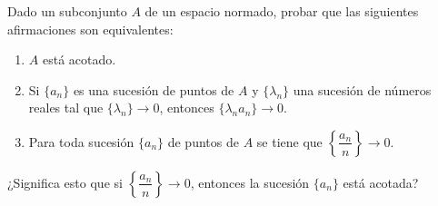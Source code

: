 \begin{ejercicio}
Dado un subconjunto \( A \) de un espacio normado, probar que las siguientes afirmaciones son equivalentes:
    \begin{enumerate}
        \item \( A \) está acotado.
        \item Si \( \{a_n\} \) es una sucesión de puntos de \( A \) y \( \{\lambda_n\} \) una sucesión de números reales tal que \( \{\lambda_n\} \rightarrow 0 \), entonces \( \{\lambda_n  a_n\} \rightarrow 0 \).
        \item Para toda sucesión \( \{a_n\} \) de puntos de \( A \) se tiene que \( \left\{\dfrac{a_n}{n}\right\} \rightarrow 0 \).
    \end{enumerate}
    ¿Significa esto que si \( \left\{\dfrac{a_n}{n}\right\} \rightarrow 0 \), entonces la sucesión \( \{a_n\} \) está acotada?\\


\end{ejercicio}
